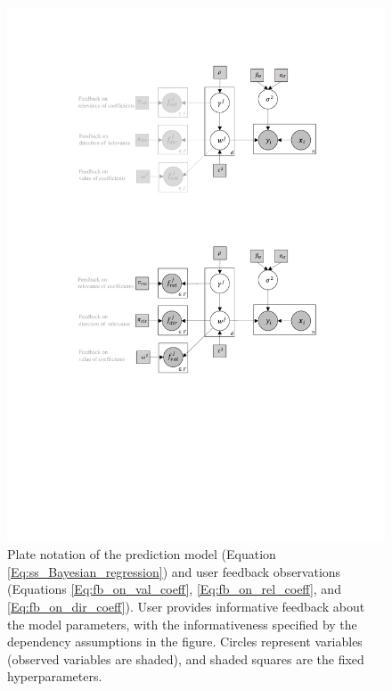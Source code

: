 \documentclass[dissertation,math,vertlayout,pdfa,colorlinks]{aaltoseries}
\begin{document}
\begin{figure}
	\includegraphics[width=\linewidth]{Figures/Plate_diagram_KE.pdf}
	\caption{Plate notation of the prediction model (Equation \ref{Eq:ss_Bayesian_regression}) and user feedback observations (Equations \ref{Eq:fb_on_val_coeff}, \ref{Eq:fb_on_rel_coeff}, and \ref{Eq:fb_on_dir_coeff}). User provides informative feedback about the model parameters, with the informativeness specified by the dependency assumptions in the figure. %
	Circles represent variables (observed variables are shaded), and shaded squares are the fixed hyperparameters.}
	\label{fig:Plate_KE}
\end{figure}
\end{document}
